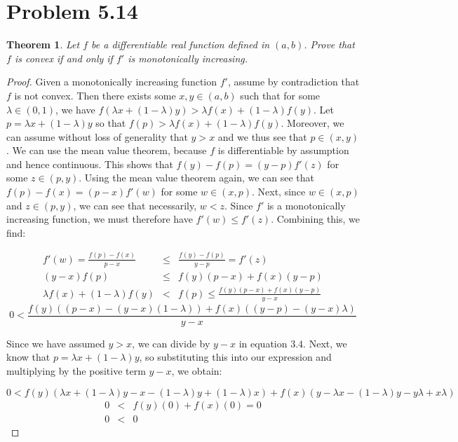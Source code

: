 \documentclass[psamsfonts]{amsart}
\newtheorem{thm}{Theorem}[section]
\theoremstyle{definition}
\theoremstyle{remark}
\numberwithin{equation}{section}
\begin{document}
\section{Problem 5.14}

\begin{thm}
Let $f$ be a differentiable real function defined in $(a,b)$. Prove that $f$ is convex if and only if $f'$ is monotonically increasing.
\end{thm}

\begin{proof}
Given a monotonically increasing function $f'$, assume by contradiction that $f$ is not convex. Then there exists some $x,y \in (a,b)$ such that for some $\lambda \in (0,1)$, we have $f(\lambda x + (1 - \lambda) y) > \lambda f(x) + (1- \lambda) f(y)$. Let $p = \lambda x + (1-\lambda) y$ so that $f(p) > \lambda f(x) + (1- \lambda) f(y)$. Moreover, we can assume without loss of generality that $y > x$ and we thus see that $p \in (x,y)$. We can use the mean value theorem, because $f$ is differentiable by assumption and hence continuous. This shows that $f(y) - f(p) = (y - p) f'(z)$ for some $z \in (p,y)$. Using the mean value theorem again, we can see that $f(p) - f(x) = (p - x) f'(w)$ for some $w \in (x,p)$. Next, since $w \in (x,p)$ and $z \in (p,y)$, we can see that necessarily, $w < z$. Since $f'$ is a monotonically increasing function, we must therefore have $f'(w) \leq f'(z)$. Combining this, we find:

\begin{eqnarray}
f'(w) = \frac{f(p) - f(x)}{p-x} &\leq& \frac{f(y) - f(p)}{y - p} = f'(z) \\
(y-x) f(p) &\leq& f(y) (p - x) + f(x) (y - p) \\
\lambda f(x) + (1- \lambda) f(y) &<& f(p) \leq \frac{f(y) (p-x) + f(x) (y - p)}{y - x}
\end{eqnarray}
\begin{equation}
0 < \frac{f(y) ( (p - x) - (y - x) (1 - \lambda)) + f(x)( (y - p) - (y- x) \lambda)}{y - x}
\end{equation}

Since we have assumed $y > x$, we can divide by $y - x$ in equation $3.4$. Next, we know that $p = \lambda x + (1-\lambda)y$, so substituting this into our expression and multiplying by the positive term $y - x$, we obtain:

\begin{equation}
0 < f(y) (\lambda x + (1-\lambda)y - x - (1-\lambda)y + (1 - \lambda)x) + f(x)( y - \lambda x - (1 -\lambda)y - y\lambda + x\lambda)
\end{equation} 
\begin{eqnarray}
0 &<& f(y) (0) + f(x) (0) = 0 \\
0 &<& 0
\end{eqnarray}


\end{proof}
\end{document}
